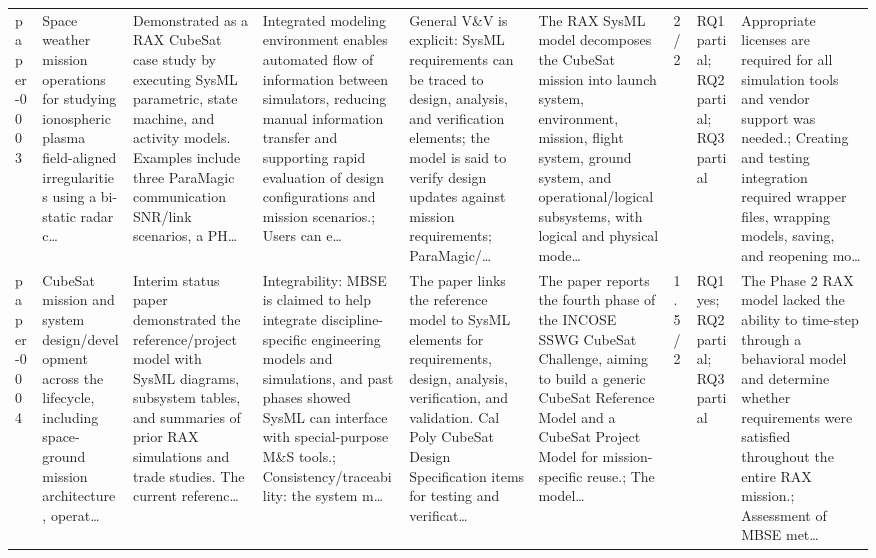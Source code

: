 \documentclass[10pt]{article}
\begin{document}
\begin{landscape}
\begin{longtable}{p{1.0cm}p{2.4cm}p{3.1cm}p{3.7cm}p{3.4cm}p{3.1cm}p{1.0cm}p{1.8cm}p{3.4cm}}
paper-0003 & Space weather mission operations for studying ionospheric plasma field-aligned irregularities using a bi-static radar c… & Demonstrated as a RAX CubeSat case study by executing SysML parametric, state machine, and activity models. Examples include three ParaMagic communication SNR/link scenarios, a PH… & Integrated modeling environment enables automated flow of information between simulators, reducing manual information transfer and supporting rapid evaluation of design configurations and mission scenarios.; Users can e… & General V\&V is explicit: SysML requirements can be traced to design, analysis, and verification elements; the model is said to verify design updates against mission requirements; ParaMagic/… & The RAX SysML model decomposes the CubeSat mission into launch system, environment, mission, flight system, ground system, and operational/logical subsystems, with logical and physical mode… & 2/2 & RQ1 partial; RQ2 partial; RQ3 partial & Appropriate licenses are required for all simulation tools and vendor support was needed.; Creating and testing integration required wrapper files, wrapping models, saving, and reopening mo… \\
paper-0004 & CubeSat mission and system design/development across the lifecycle, including space-ground mission architecture, operat… & Interim status paper demonstrated the reference/project model with SysML diagrams, subsystem tables, and summaries of prior RAX simulations and trade studies. The current referenc… & Integrability: MBSE is claimed to help integrate discipline-specific engineering models and simulations, and past phases showed SysML can interface with special-purpose M\&S tools.; Consistency/traceability: the system m… & The paper links the reference model to SysML elements for requirements, design, analysis, verification, and validation. Cal Poly CubeSat Design Specification items for testing and verificat… & The paper reports the fourth phase of the INCOSE SSWG CubeSat Challenge, aiming to build a generic CubeSat Reference Model and a CubeSat Project Model for mission-specific reuse.; The model… & 1.5/2 & RQ1 yes; RQ2 partial; RQ3 partial & The Phase 2 RAX model lacked the ability to time-step through a behavioral model and determine whether requirements were satisfied throughout the entire RAX mission.; Assessment of MBSE met… \\

\end{longtable}
\end{landscape}
\end{document}
